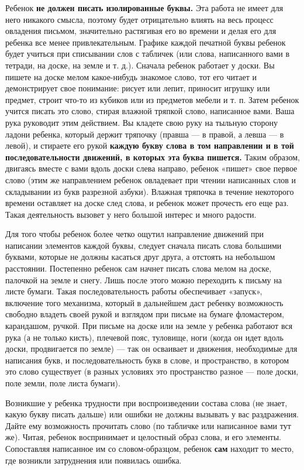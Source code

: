 \documentclass[a5paper]{book}
\begin{document}
Ребенок \textbf{не должен писать изолированные буквы.} Эта работа не
имеет для него никакого смысла, поэтому будет отрицательно влиять на
весь процесс овладения письмом, значительно растягивая его во времени и
делая его для ребенка все менее привлекательным. Графике каждой печатной
буквы ребенок будет учиться при списывании слов с табличек (или слова,
написанного вами в тетради, на доске, на земле и т. д.). Сначала ребенок
работает у доски. Вы пишете на доске мелом какое-нибудь знакомое слово,
тот его читает и демонстрирует свое понимание: рисует или лепит,
приносит игрушку или предмет, строит что-то из кубиков или из предметов
мебели и т. п. Затем ребенок учится писать это слово, стирая влажной
тряпкой слово, написанное вами. Ваша рука руководит этим действием. Вы
кладете свою руку на тыльную сторону ладони ребенка, который держит
тряпочку (правша --- в правой, а левша --- в левой), и стираете его
рукой \textbf{каждую букву слова в том направлении и в той
последовательности движений, в которых эта буква пишется.} Таким
образом, двигаясь вместе с вами вдоль доски слева направо, ребенок
«пишет» свое первое слово (этим же направлением ребенок овладевает при
чтении написанных слов и складывании из букв разрезной азбуки). Влажная
тряпочка в течение некоторого времени оставляет на доске след слова, и
ребенок может прочесть его еще раз. Такая деятельность вызовет у него
большой интерес и много радости.

Для того чтобы ребенок более четко ощутил направление движений при
написании элементов каждой буквы, следует сначала писать слова большими
буквами, которые не должны касаться друг друга, а отстоять на небольшом
расстоянии. Постепенно ребенок сам начнет писать слова мелом на доске,
палочкой на земле и снегу. Лишь после этого можно переходить к письму на
листе бумаги. Такая последовательность работы обеспечивает «запуск»,
включение того механизма, который в дальнейшем даст ребенку возможность
свободно владеть своей рукой и взглядом при письме на бумаге
фломастером, карандашом, ручкой. При письме на доске или на земле у
ребенка работают вся рука (а не только кисть), плечевой пояс, туловище,
ноги (когда он идет вдоль доски, продвигается по земле) --- так он
осваивает и движения, необходимые для написания букв, и
последовательность букв в слове, и пространство, в котором это слово
существует (в разных условиях это пространство разное --- поле доски,
поле земли, поле листа бумаги).

Возникшие у ребенка трудности при воспроизведении состава слова (не
знает, какую букву писать дальше) или ошибки не должны вызывать у вас
раздражения. Дайте ему возможность прочитать слово (по табличке или
написанное вами тут же). Читая, ребенок воспринимает и целостный образ
слова, и его элементы. Сопоставляя написанное им со словом-образцом,
ребенок \textbf{сам} находит то место, где возникли затруднения или
появилась ошибка.
\end{document}

